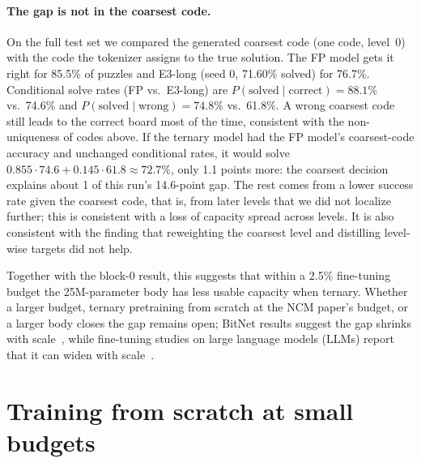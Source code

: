 \documentclass[11pt]{article}
\begin{document}
\paragraph{The gap is not in the coarsest code.}
On the full test set we compared the generated coarsest code (one code, level~0) with the code the tokenizer
assigns to the true solution. The FP model gets it right for 85.5\% of puzzles and E3-long (seed 0, 71.60\%
solved) for 76.7\%. Conditional solve rates (FP vs.\ E3-long) are $P(\text{solved}\mid\text{correct})=88.1\%$
vs.\ 74.6\% and $P(\text{solved}\mid\text{wrong})=74.8\%$ vs.\ 61.8\%. A wrong coarsest code still leads to the
correct board most of the time, consistent with the non-uniqueness of codes above. If the ternary model had the FP
model's coarsest-code accuracy and unchanged conditional rates, it would solve
$0.855\cdot74.6+0.145\cdot61.8\approx72.7\%$, only 1.1 points more: the coarsest decision explains about 1 of this
run's 14.6-point gap. The rest comes from a lower success rate given the coarsest code, that is, from later levels
that we did not localize further; this is consistent with a loss of capacity spread across levels. It is also
consistent with the finding that reweighting the coarsest level and distilling level-wise targets did not help.

Together with the block-0 result, this suggests that within a 2.5\% fine-tuning budget the 25M-parameter body
has less usable capacity when ternary. Whether a larger budget, ternary pretraining from scratch at the NCM
paper's budget, or a larger body closes the gap remains open; BitNet results suggest the gap shrinks with
scale~\citep{ma2024era}, while fine-tuning studies on large language models (LLMs) report that it can widen with
scale~\citep{bitdistill}.

\section{Training from scratch at small budgets}
\label{sec:scratch}
\end{document}
